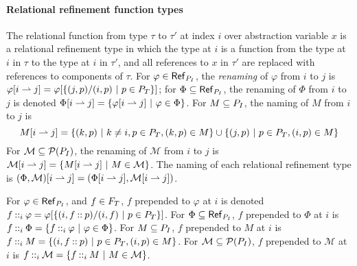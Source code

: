 \paragraph{Relational refinement function types}
%
The relational function from type $\tau$ to $\tau'$ at index $i$ over
abstraction variable $x$ is a relational refinement type in which the
type at $i$ is a function from the type at $i$ in $\tau$ to the type
at $i$ in $\tau'$, and all references to $x$ in $\tau'$ are replaced
with references to components of $\tau$.
For $\varphi \in \mathsf{Ref}_{ P_{I} }$, the \emph{renaming} of
$\varphi$ from $i$ to $j$ is
$\varphi[ i \rightharpoonup j ] = \varphi[ \{ (j, p) / (i, p)\ |\  p \in
  P_T \} ]$;
for $\Phi \subseteq \mathsf{Ref}_{P_{I}}$, the renaming of $\Phi$
from $i$ to $j$ is denoted
$\Phi[ i \rightharpoonup j ] = \{  \varphi[ i \rightharpoonup j ] \ |\  \varphi
  \in \Phi  \}$.
For $M \subseteq P_{I}$, the naming of $M$ from $i$ to $j$ is
\[ \rename{M}{i}{j} = %
  \setformer{ (k, p) }{ k \not= i, p \in \typos, (k, p) \in M }
  \union %
  \setformer{ (j, p) }{ p \in \typos, (i, p) \in M } \]
For $\mathcal{M} \subseteq \mathcal{P}(P_{I})$, the renaming of
$\mathcal{M}$ from $i$ to $j$ is
$\mathcal{M}[ i \rightharpoonup j ] = \{  M[ i \rightharpoonup j ] \ |\  M \in
  \mathcal{M}  \}$.
The naming of each relational refinement type is
$(\Phi, \mathcal{M})[ i \rightharpoonup j ] = (\Phi[ i \rightharpoonup j ], 
  \mathcal{M}[ i \rightharpoonup j ])$.
  
For $\varphi \in \mathsf{Ref}_{ P_{I} }$, and $f \in F_T$,
$f$ prepended to $\varphi$ at $i$ is denoted
$f \mathbin{::}_{i} \varphi = \varphi[ \{  (i, f \mathbin{::} p) / (i,
  f)\ |\  p \in P_T  \} ]$.
%  
For $\Phi \subseteq \mathsf{Ref}_{ P_{I} }$, $f$ prepended to $\Phi$
at $i$ is
$f \mathbin{::}_{i} \Phi = \{  f \mathbin{::}_{i} \varphi \ |\  \varphi \in
  \Phi  \}$.
For $M \subseteq P_{I}$, $f$ prepended to $M$ at $i$ is
$f \mathbin{::}_{i} M = \{  (i, f \mathbin{::} p) \ |\  p \in P_T,
  (i, p) \in M \}$.
%
For $\mathcal{M} \subseteq \mathcal{P}(P_{I})$, $f$ prepended to
$\mathcal{M}$ at $i$ is
$f \mathbin{::}_{i} \mathcal{M} = \{  f \mathbin{::}_{i} M \ |\  M
  \in \mathcal{M}  \}$.

